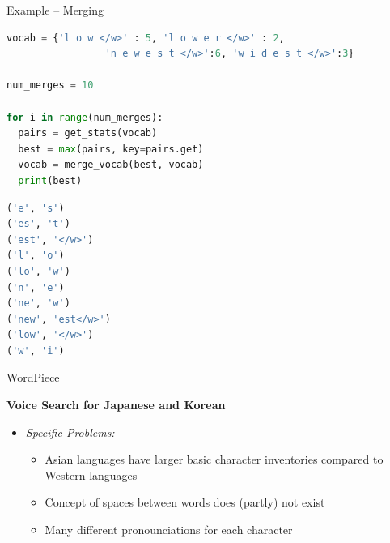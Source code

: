 \begin{vbframe}{Example -- Merging}

\vspace{-.5cm}

\begin{lstlisting}[language=Python]
vocab = {'l o w </w>' : 5, 'l o w e r </w>' : 2, 
				 'n e w e s t </w>':6, 'w i d e s t </w>':3}

num_merges = 10

for i in range(num_merges):
  pairs = get_stats(vocab)
  best = max(pairs, key=pairs.get)
  vocab = merge_vocab(best, vocab)
  print(best)
\end{lstlisting}

\vspace{-.5cm}

\begin{lstlisting}[language=Python]
('e', 's')
('es', 't')
('est', '</w>')
('l', 'o')
('lo', 'w')
('n', 'e')
('ne', 'w')
('new', 'est</w>')
('low', '</w>')
('w', 'i')
\end{lstlisting}

\end{vbframe}


\begin{frame}{WordPiece}

\vfill

	\textbf{Voice Search for Japanese and Korean \href{https://storage.googleapis.com/pub-tools-public-publication-data/pdf/37842.pdf}{}}

	\begin{itemize}
		\item \textit{Specific Problems:} 
			\begin{itemize}
				\item Asian languages have larger basic character inventories compared to Western languages
				\item Concept of spaces between words does (partly) not exist
				\item Many different pronounciations for each character
			\end{itemize}
	\end{itemize}
	
\vfill

\end{frame}


